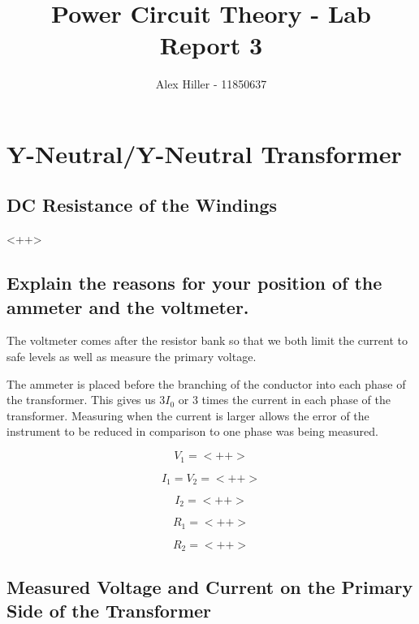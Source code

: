 \documentclass{article}
\author{Alex Hiller - 11850637}
\title{Power Circuit Theory - Lab Report 3}
\begin{document}
\maketitle


\clearpage

\section{Y-Neutral/Y-Neutral Transformer}

\subsection{DC Resistance of the Windings}
<++>

\subsection{Explain the reasons for your position of the ammeter and the voltmeter.}
The voltmeter comes after the resistor bank so that we both limit the current to safe levels as well as measure the primary voltage.

The ammeter is placed before the branching of the conductor into each phase of the transformer. This gives us $3 I_0$ or 3 times the current in each phase of the transformer. Measuring when the current is larger allows the error of the instrument to be reduced in comparison to one phase was being measured.


\begin{equation}
  V_1 = <++>
\end{equation}

\begin{equation}
  I_1 = V_2 = <++>
\end{equation}

\begin{equation}
  I_2 = <++>
\end{equation}

\begin{equation}
  R_1 = <++>
\end{equation}

\begin{equation}
  R_2 = <++>
\end{equation}

\subsection{Measured Voltage and Current on the Primary Side of the Transformer}
\end{document}
